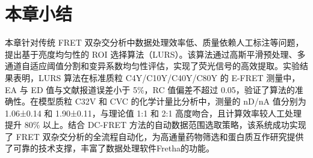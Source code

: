 \section{本章小结}

\ifshowtext
本章针对传统 FRET 双杂交分析中数据处理效率低、质量依赖人工标注等问题，提出基于亮度均匀性的 ROI 选择算法（LURS）。该算法通过高斯平滑预处理、多通道自适应阈值分割和变异系数均匀性评估，实现了荧光信号的高效提取。实验结果表明，LURS 算法在标准质粒 C4Y/C10Y/C40Y/C80Y 的 E-FRET 测量中，EA 与 ED 值与文献报道误差小于 5\%，RC 值偏差不超过 0.05，验证了算法的准确性。在模型质粒 C32V 和 CVC 的化学计量比分析中，测量的 nD/nA 值分别为 1.06±0.14 和 1.90±0.11，与理论值 1:1 和 2:1 高度吻合，且计算效率较人工处理提升 80\% 以上。结合 DC-FRET 方法的自动数据范围选取策略，该系统成功实现了 FRET 双杂交分析的全流程自动化，为高通量药物筛选和蛋白质互作研究提供了可靠的技术支撑，丰富了数据处理软件Fretha的功能。
\fi